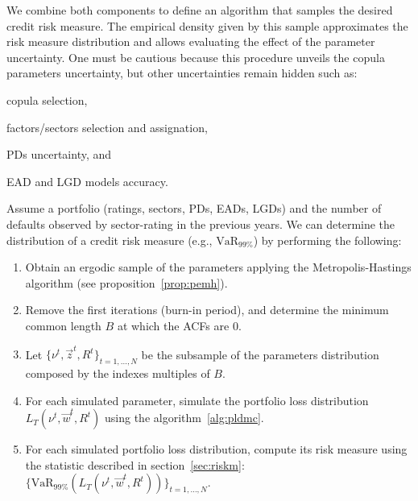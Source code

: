 \documentclass[11pt,fleqn]{book} %
\begin{document}
We combine both components to define an algorithm that samples the desired
credit risk measure. The empirical density given by this sample 
approximates the risk measure distribution and allows evaluating the 
effect of the parameter uncertainty. One must be cautious because this 
procedure unveils the copula parameters uncertainty, but other uncertainties
remain hidden such as:
\begin{inparaenum}[1)]
	\item copula selection, 
	\item factors/sectors selection and assignation,
	\item PDs uncertainty, and
	\item EAD and LGD models accuracy.
\end{inparaenum}

\begin{algorithm}
	\label{alg:crmd}
	Assume a portfolio (ratings, sectors, PDs, EADs, LGDs) and the number 
	of defaults observed by sector-rating in the previous years. We can
	determine the distribution of a credit risk measure 
	(e.g., $\text{VaR}_{99\%}$) by performing the following:
	\begin{enumerate}
		\item Obtain an ergodic sample of the parameters applying the
		Metropolis-Hastings algorithm (see proposition~\ref{prop:pemh}).
		\item Remove the first iterations (burn-in period), and determine
		the minimum common length $B$ at which the ACFs are $0$.
		\item Let $\{\nu^t, \vec{z}^t, R^t\}_{t=1,\dots,N}$ be the subsample
		of the parameters distribution composed by the indexes multiples 
		of $B$.
		\item For each simulated parameter, simulate the portfolio loss 
		distribution $L_T(\nu^t,\vec{w}^t,R^t)$ using the algorithm~\ref{alg:pldmc}.
		\item For each simulated portfolio loss distribution, compute its 
		risk measure using the statistic described in section~\ref{sec:riskm}:
		$\{\text{VaR}_{99\%}(L_T(\nu^t,\vec{w}^t,R^t))\}_{t=1,\dots,N}$.
	\end{enumerate}
\end{algorithm}
\end{document}
